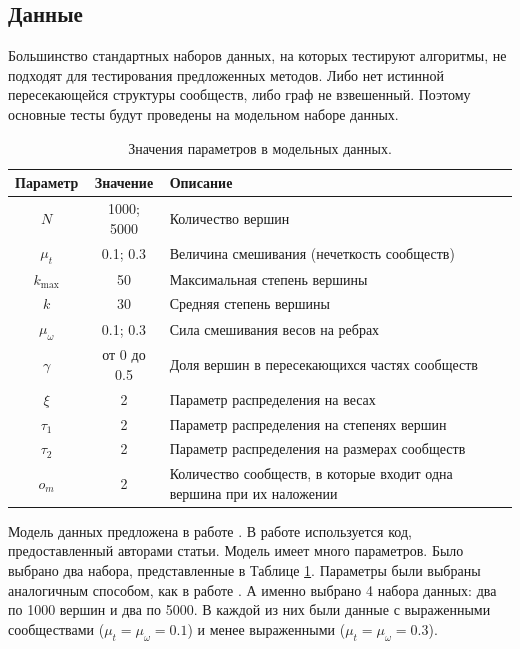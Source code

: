\documentclass{ITaSconf}
\begin{document}
\subsection{Данные}
Большинство стандартных наборов данных, на которых тестируют алгоритмы, не подходят для тестирования предложенных методов.
Либо нет истинной пересекающейся структуры сообществ, либо граф не взвешенный. 
Поэтому основные тесты будут проведены на модельном наборе данных.
\begin{center}
	\begin{table}[!th]
		\centering
		\begin{tabular}{ c c l }
			\hline
			\hline
			\textbf{Параметр} & \textbf{Значение} & \textbf{Описание} \\
			\hline
			$N$				& 1000; 5000 	& Количество вершин	\\[2px]
			$\mu_t$			& 0.1; 0.3 		& Величина смешивания (нечеткость сообществ)\\[2px]
			$k_{\max}$		& 50 			& Максимальная степень вершины\\[2px]
			$k$				& 30	 		& Средняя степень вершины\\[2px]
			$\mu_{\omega}$	& 0.1; 0.3 		& Сила смешивания весов на ребрах\\[2px]
			$\gamma$		& от 0 до 0.5 	& Доля вершин в пересекающихся частях сообществ\\[2px]
			$\xi$			& 2 			& Параметр распределения на весах\\[2px]
			$\tau_1$		& 2 			& Параметр распределения на степенях вершин\\[2px]
			$\tau_2$		& 2 			& Параметр распределения на размерах сообществ\\[2px]
			$o_m$			& 2 			& Количество сообществ, в которые входит одна вершина при их наложении \\
			\hline
			\hline
		\end{tabular}
		\centering
		\caption{Значения параметров в модельных данных. }
		\label{table:bench_params}
	\end{table}
\end{center}
Модель данных предложена в работе \cite{lancichinetti2009benchmarks}. 
В работе используется код, предоставленный авторами статьи. 
Модель имеет много параметров. 
Было выбрано два набора, представленные в Таблице \ref{table:bench_params}. 
Параметры были выбраны аналогичным способом, как в работе \cite{lu2015algorithms}. А именно выбрано 4 набора данных: два по 1000 вершин и два по 5000. В каждой из них были данные с выраженными сообществами ($\mu_t=\mu_{\omega}=0.1$) и менее выраженными ($\mu_t=\mu_{\omega}=0.3$).
\end{document}
